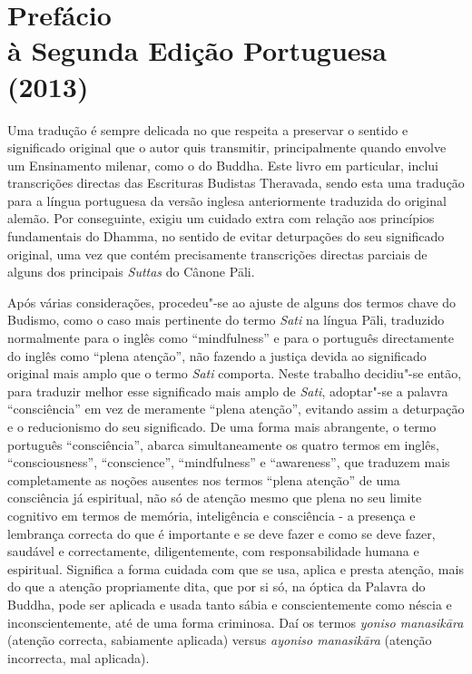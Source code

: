 \chapter[Prefácio à Segunda Edição Portuguesa (2013)]{Prefácio\\ à Segunda Edição Portuguesa\\ (2013)}

Uma tradução é sempre delicada no que respeita a preservar o sentido e
significado original que o autor quis transmitir, principalmente quando envolve
um Ensinamento milenar, como o do Buddha. Este livro em particular, inclui
transcrições directas das Escrituras Budistas Theravada, sendo esta uma tradução
para a língua portuguesa da versão inglesa anteriormente traduzida do original
alemão. Por conseguinte, exigiu um cuidado extra com relação aos princípios
fundamentais do Dhamma, no sentido de evitar deturpações do seu significado
original, uma vez que contém precisamente transcrições directas parciais de
alguns dos principais \emph{Suttas} do Cânone Pāli.

Após várias considerações, procedeu"-se ao ajuste de alguns dos termos chave do
Budismo, como o caso mais pertinente do termo \emph{Sati} na língua Pāli,
traduzido normalmente para o inglês como “mindfulness” e para o português
directamente do inglês como “plena atenção”, não fazendo a justiça devida ao
significado original mais amplo que o termo \emph{Sati} comporta. Neste trabalho
decidiu"-se então, para traduzir melhor esse significado mais amplo de
\emph{Sati}, adoptar"-se a palavra “consciência” em vez de meramente “plena
atenção”, evitando assim a deturpação e o reducionismo do seu significado. De
uma forma mais abrangente, o termo português “consciência”, abarca
simultaneamente os quatro termos em inglês, “consciousness”, “conscience”,
“mindfulness” e “awareness”, que traduzem mais completamente as noções
ausentes nos termos “plena atenção” de uma consciência já espiritual, não só
de atenção mesmo que plena no seu limite cognitivo em termos de memória,
inteligência e consciência - a presença e lembrança correcta do que é importante
e se deve fazer e como se deve fazer, saudável e correctamente, diligentemente,
com responsabilidade humana e espiritual. Significa a forma cuidada com que se
usa, aplica e presta atenção, mais do que a atenção propriamente dita, que por
si só, na óptica da Palavra do Buddha, pode ser aplicada e usada tanto sábia e 
conscientemente como néscia e inconscientemente, até de uma forma criminosa. 
Daí os termos \emph{yoniso manasikāra} (atenção correcta, sabiamente aplicada) 
versus \emph{ayoniso manasikāra} (atenção incorrecta, mal aplicada).

